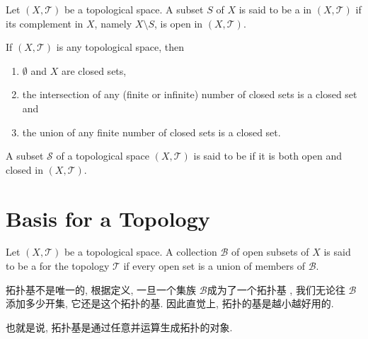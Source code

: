 \documentclass[../main.tex]{subfiles}
\begin{document}
\begin{definition}{}{}
Let $(X, \mathcal{T})$ be a topological space. A subset $S$ of $X$ is said to be a  in $(X, \mathcal{T})$ if its complement in $X$, namely $X \setminus S$, is open in $(X, \mathcal{T})$.
\end{definition}
\begin{proposition}{}{}
If $(X, \mathcal{T})$ is any topological space, then
\begin{enumerate}
    \item[(i)] $\emptyset$ and $X$ are closed sets,
    \item[(ii)] the intersection of any (finite or infinite) number of closed sets is a closed set and
    \item[(iii)] the union of any finite number of closed sets is a closed set.
\end{enumerate}
\end{proposition}
\begin{definition}{}{}
A subset $\mathcal{S}$ of a topological space $(X, \mathcal{T})$ is said to be  if it is both open and closed in $(X, \mathcal{T})$.
\end{definition}

\section{Basis for a Topology}

\begin{definition}{}{}
Let $(X, \mathcal{T})$ be a topological space. A collection $\mathcal{B}$ of open subsets of $X$ is said to be a  for the topology $\mathcal{T}$ if every open set is a union of members of $\mathcal{B}$.
\end{definition}

\begin{remark}
    拓扑基不是唯一的, 根据定义, 一旦一个集族 \(  \mathcal{B}  \)成为了一个拓扑基 , 我们无论往 \(  \mathcal{B}  \)添加多少开集, 它还是这个拓扑的基. 因此直觉上, 拓扑的基是越小越好用的.  
\end{remark}

\begin{note}
    也就是说, 拓扑基是通过任意并运算生成拓扑的对象.
\end{note}
\end{document}
